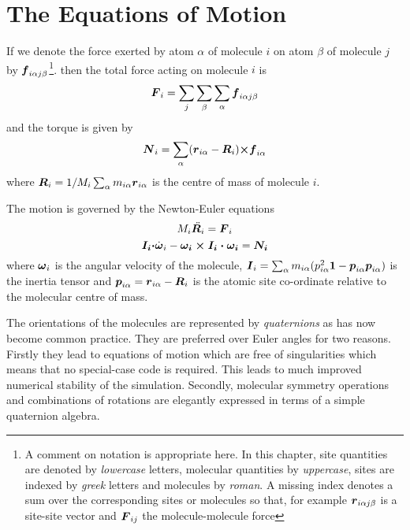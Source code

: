 \documentclass[twoside]{report}
\newcommand{\bm}[1]{\mbox{\boldmath \protect\(#1\protect\)}}
\begin{document}
\section{The Equations of Motion}  %
If we denote the force exerted by atom $\alpha$ of molecule $i$ on
atom $\beta$ of molecule $j$ by $\bm{f}_{i\alpha j\beta}$\footnote{A
comment on notation is appropriate here.  In this chapter, site
quantities are denoted by {\em lowercase\/} letters, molecular
quantities by {\em uppercase}, sites are indexed by {\em greek\/}
letters and molecules by {\em roman}. A missing index denotes a sum
over the corresponding sites or molecules so that, for example
$\bm{r}_{i\alpha j\beta}$ is a site-site vector and $\bm{F}_{ij}$ the
molecule-molecule force}.  then the total force acting on molecule $i$
is
\begin{equation}
\label{eqn:comf}
\bm{F}_i = \sum_j \sum_\beta \sum_\alpha \bm{f}_{i\alpha j\beta}
\end{equation}
and the torque is given by
\begin{equation}
\label{eqn:comt}
\bm{N}_i = \sum_\alpha (\bm{r}_{i \alpha} - \bm{R}_{i}) 
\bm{\times f}_{i\alpha} 
\end{equation}
where $\bm{R}_{i} = 1/M_i \sum_\alpha
m_{i\alpha} \bm{r}_{i\alpha}$ is the centre of mass of molecule $i$.

The motion is governed by the Newton-Euler equations
\begin{equation}
M_i\ddot{\bm{R}_i} = \bm{F}_i \label{eqn:newton}
\end{equation}
\begin{equation}
\bm{I_i \cdot} \dot{\bm{\omega}}_i - \bm{\omega_i \times I_i \cdot
\omega_i} = \bm{N_i} \label{eqn:euler}
\end{equation}
where  $\bm{\omega}_i$ is the angular velocity of the molecule, 
$ \bm{I}_i = \sum_{\alpha} m_{i\alpha} 
( p_{i\alpha}^2 \bm{1} - \bm{p}_{i\alpha}\bm{p}_{i\alpha} ) $ 
is the inertia tensor and 
$\bm{p}_{i\alpha} = \bm{r}_{i\alpha} - \bm{R}_i $
is the atomic site co-ordinate relative to the molecular centre of mass.

\label{sec:quaternions}
The orientations of the molecules are represented by {\em quaternions\/}
as  has now  become common  practice.   They are  preferred over Euler
angles for two reasons. Firstly they lead to equations of motion which
are  free  of singularities\cite{evans:77} which   means  that   no
special-case  code is required. This  leads to much improved numerical
stability      of  the  simulation\cite{evans:77b}.   Secondly,
molecular symmetry   operations   and  combinations of  rotations  are
elegantly expressed   in    terms  of     a     simple      quaternion
algebra\cite{evans:77b,pawley:85b}.
\end{document}
